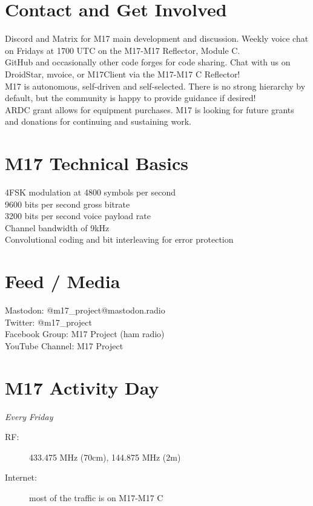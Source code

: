\documentclass[10pt,letterpaper,notitlepage]{article}
\begin{document}
  \begin{multicols}{2}
  \section*{Contact and Get Involved}
    \justifying
    Discord and Matrix for M17 main development and discussion. Weekly voice chat on Fridays at 1700 UTC on the M17-M17 Reflector, Module C.\\
    GitHub and occasionally other code forges for code sharing. Chat with us on DroidStar, mvoice, or M17Client via the M17-M17 C Reflector!\\
    M17 is autonomous, self-driven and self-selected. There is no strong hierarchy by default, but the community is happy to provide guidance if desired!\\
    ARDC grant allows for equipment purchases. M17 is looking for future grants and donations for continuing and sustaining work.
  \section*{M17 Technical Basics}
    \justifying
    4FSK modulation at 4800 symbols per second\\
    9600 bits per second gross bitrate\\
    3200 bits per second voice payload rate\\
    Channel bandwidth of 9kHz\\
    Convolutional coding and bit interleaving for error protection\\
  \columnbreak
  \section*{Feed / Media}
    \justifying
    Mastodon: @m17\_project@mastodon.radio\\
    Twitter: @m17\_project\\
    Facebook Group: M17 Project (ham radio)\\
    YouTube Channel: M17 Project\\
  \section*{M17 Activity Day}
    \centering
    \emph{Every Friday}\\
    \raggedright
    \begin{description}
      \item[RF:] 433.475 MHz (70cm), 144.875 MHz (2m)
      \item[Internet:] most of the traffic is on M17-M17 C
    \end{description}
    \vfill\null
  \end{multicols}
  \centering
\end{document}
